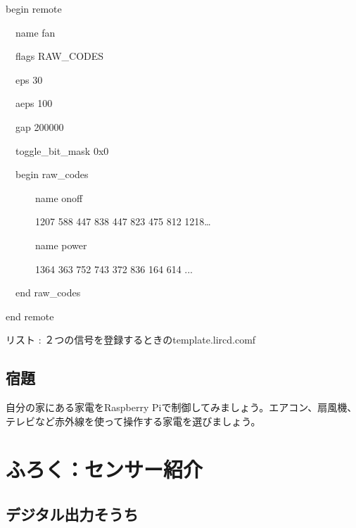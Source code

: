 \documentclass[a4paper,dvipdfmx]{jarticle}
\newcounter{List}
\renewcommand\theList{\arabic{List}}
\begin{document}
\centering
\begin{minipage}{17.006cm}
begin remote

\ \ name fan

\ \ flags RAW\_CODES

\ \ eps 30

\ \ aeps 100


\bigskip

\ \ gap 200000

\ \ toggle\_bit\_mask 0x0


\bigskip

\ \ begin raw\_codes


\bigskip

\ \ \ \ \ \ name onoff

\ \ \ \ \ \ 1207 588 447 838 447 823 475 812 1218{\dots}


\bigskip

\ \ \ \ \ \ \textcolor[rgb]{1.0,0.2,0.2}{name power}

{\color[rgb]{1.0,0.2,0.2}
\ \ \ \ \ \ 1364 363 752 743 372 836 164 614 ...}


\bigskip

\ \ end raw\_codes


\bigskip

end remote


\bigskip


\bigskip


\bigskip


\bigskip

{\mdseries
リスト \stepcounter{List}{\theList}:
２つの信号を登録するときのtemplate.lircd.comf}
\end{minipage}
\subsection{宿題}
自分の家にある家電をRaspberry
Piで制御してみましょう。エアコン、扇風機、テレビなど赤外線を使って操作する家電を選びましょう。

\clearpage\section{ふろく：センサー紹介}
\label{bkm:RefHeadingToc37441454936466}\subsection[デジタル出力そうち]{\rmfamily
デジタル出力そうち}
\end{document}

